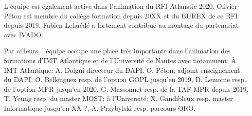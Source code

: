 L'équipe est également active dans l'animation du RFI Atlanstic 2020. Olivier Péton est membre du collège formation depuis 20XX et du BUREX de ce RFI depuis 2019. Fabien Lehuédé a fortement contribué au montage du partenariat avec IVADO. 

Par ailleurs, l'équipe occupe une place très importante dans l'animation des formations d'IMT Atlantique et de l'Université de Nantes avec notamment: 
\`A IMT Atlantique: A. Dolgui directeur du DAPI, O. Péton, adjoint enseignement du DAPI, O. Bellenguez resp. de l'option GOPL jusqu'en 2019, D. Lemoine resp. de l'option MPR jusqu'en 2020, G. Massonnet resp. de la TAF MPR depuis 2019, T. Yeung resp. du master MOST;
à l'Université: 
X. Gandibleux resp. master Informatique jusqu'en XX ?, 
A. Przybylski resp. parcours ORO, 



